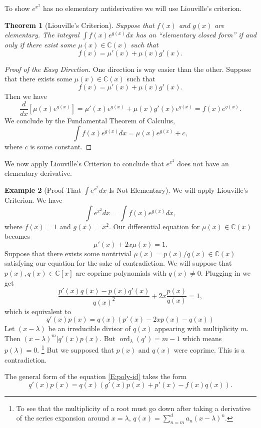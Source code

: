 \documentclass[12pt]{book}
\numberwithin{equation}{section}
\newtheorem{theorem}{Theorem}[subsection]
\theoremstyle{definition}
\newtheorem{example}[theorem]{Example}
\theoremstyle{remark}
\newcommand{\CC}{\mathbb{C}}
\newcommand{\ord}{\operatorname{ord}}
\begin{document}
To show $e^{x^2}$ has no elementary antiderivative we will use Liouville's criterion. 
\begin{theorem}[Liouville's Criterion]
	Suppose that $f(x)$ and $g(x)$ are elementary. 
	The integral $\int f(x) e^{g(x)} dx$ has an ``elementary closed form'' if and only if there exist some $\mu(x) \in \CC(x)$ such that 
	 $$ f(x) = \mu'(x) + \mu(x) g'(x).$$
\end{theorem}
\begin{proof}[Proof of the Easy Direction]
One direction is way easier than the other.
Suppose that there exists some $\mu(x) \in \CC(x)$ such that 
 $$ f(x) = \mu'(x)+\mu(x)g'(x).$$
 Then we have 
  $$\dfrac{d}{dx}\left[ \mu(x) e^{g(x)}\right] = \mu'(x) e^{g(x)} + \mu(x) g'(x) e^{g(x)} = f(x)e^{g(x)}. $$
 We conclude by the Fundamental Theorem of Calculus, 
 $$\int f(x)e^{g(x)} dx= \mu(x) e^{g(x)} + c,$$
 where $c$ is some constant. 
\end{proof}

We now apply Liouville's Criterion to conclude that $e^{x^2}$ does not have an elementary derivative.
\begin{example}[Proof That $\int e^{x^2} dx$ Is Not Elementary]
	We will apply Liouville's Criterion. We have 
	 $$ \int e^{x^2} dx = \int f(x) e^{g(x)} dx,$$
	where $f(x) = 1$ and $g(x) = x^2$. 
	Our differential equation for $\mu(x)\in\CC(x)$ becomes 
	 $$ \mu'(x) + 2x \mu(x) =  1.$$
	Suppose that there exists some nontrivial $\mu(x) = p(x)/q(x) \in \CC(x)$ satisfying our equation for the sake of contradiction. 
	We will suppose that $p(x),q(x) \in \CC[x]$ are coprime polynomials with $q(x)\neq 0$. 
	Plugging in we get  
	 $$ \frac{p'(x)q(x) - p(x) q'(x)}{q(x)^2} + 2x \frac{p(x)}{q(x)} = 1,$$
	which is equivalent to 
	\begin{equation}\label{E:poly-id}
 q'(x) p(x) = q(x)( p'(x)-2xp(x)-q(x))
	\end{equation}
	Let $(x-\lambda)$ be an irreducible divisor of $q(x)$ appearing with multiplicity $m$.
	Then $(x-\lambda)^m \vert q'(x)p(x)$. 
	But $\ord_{\lambda}(q') = m-1$ which means $p(\lambda)=0$. \footnote{To see that the multiplicity of a root must go down after taking a derivative of the series expansion around $x=\lambda$,  $q(x)=\sum_{n=m}^d a_n (x-\lambda)^n. $}
	But we supposed that $p(x)$ and $q(x)$ were coprime. 
	This is a contradiction.	 
\end{example}

The general form of the equation \eqref{E:poly-id} takes the form 
\begin{equation}\label{E:poly-eqn}
q'(x) p(x) = q(x)( g'(x)p(x) + p'(x)-f(x)q(x)).
\end{equation}
\end{document}
